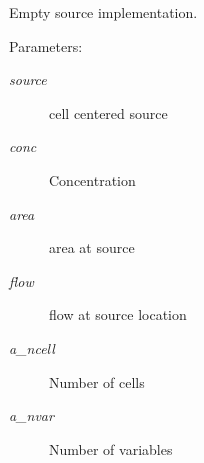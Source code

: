 Empty source implementation. 

\begin{Desc}
\item[Parameters:]
\begin{description}
\item[{\em source}]cell centered source \item[{\em conc}]Concentration\item[{\em area}]area at source\item[{\em flow}]flow at source location\item[{\em a\_\-ncell}]Number of cells\item[{\em a\_\-nvar}]Number of variables \end{description}
\end{Desc}
